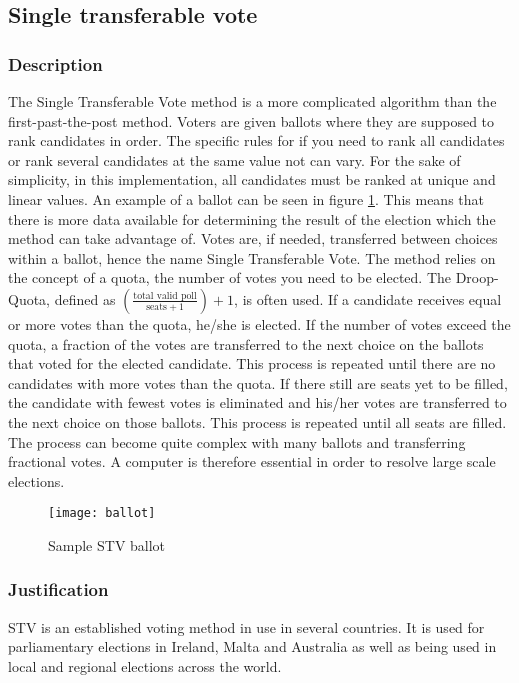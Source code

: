 \documentclass[12pt]{article}
\begin{document}
\subsection{Single transferable vote}
\subsubsection{Description}
The Single Transferable Vote method is a more complicated algorithm than the first-past-the-post method. Voters are given ballots where they are supposed to rank candidates in order. The specific rules for if you need to rank all candidates or rank several candidates at the same value not can vary. For the sake of simplicity, in this implementation, all candidates must be ranked at unique and linear values. An example of a ballot can be seen in figure \ref{fig:stv ballot}.	This means that there is more data available for determining the result of the election which the method can take advantage of. Votes are, if needed, transferred between choices within a ballot, hence the name Single Transferable Vote. The method relies on the concept of a quota, the number of votes you need to be elected. The Droop-Quota, defined as $(\frac{\text{total valid poll}}{\text{seats} + 1})+1$, is often used. If a candidate receives equal or more votes than the quota, he/she is elected. If the number of votes exceed the quota, a fraction of the votes are transferred to the next choice on the ballots that voted for the elected candidate. This process is repeated until there are no candidates with more votes than the quota. If there still are seats yet to be filled, the candidate with fewest votes is eliminated and his/her votes are transferred to the next choice on those ballots. This process is repeated until all seats are filled. The process can become quite complex with many ballots and transferring fractional votes. A computer is therefore essential in order to resolve large scale elections.
\begin{figure}
	\centering
	\texttt{[image: ballot]}
	\caption{Sample STV ballot}
	\label{fig:stv ballot}
\end{figure}
\subsubsection{Justification}
STV is an established voting method in use in several countries. It is used for parliamentary elections in Ireland, Malta and Australia as well as being used in local and regional elections across the world.
\end{document}
